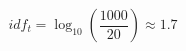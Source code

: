 \documentclass[preview]{standalone}
\begin{document}
\begin{align*}
idf_t = \log_{10}\!\left(\dfrac{1000}{20}\right) \approx 1.7
\end{align*}
\end{document}
